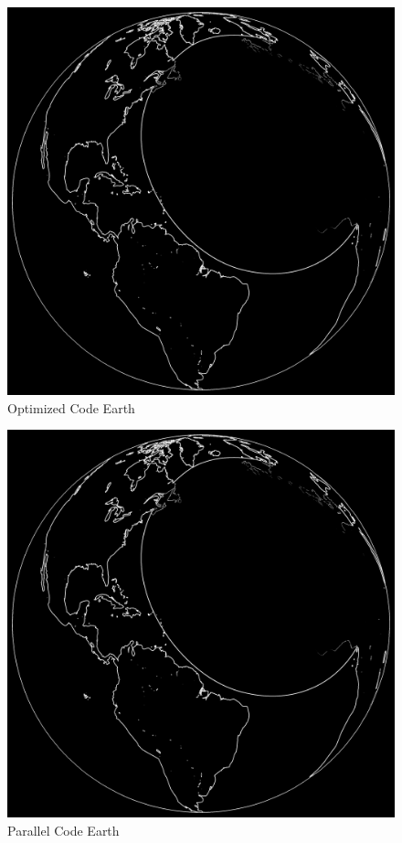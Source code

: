 \documentclass[letterpaper,11pt]{article}
\begin{document}
\begin{figure}[H]
  \caption{Optimized Code Earth}
  \includegraphics[scale=0.1]{earth_fast.png}
\end{figure}
\begin{figure}[H]
  \caption{Parallel Code Earth}
  \includegraphics[scale=0.1]{earth_omp.png}
\end{figure}
\end{document}
